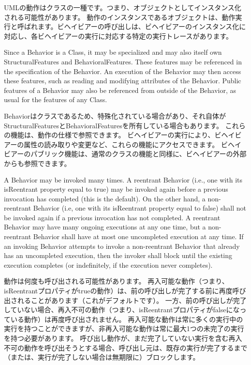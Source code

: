 \documentclass[a4paper,11pt]{ltjsarticle}
\begin{document}
UMLの動作はクラスの一種です。つまり、オブジェクトとしてインスタンス化される可能性があります。
動作のインスタンスであるオブジェクトは、動作実行と呼ばれます。ビヘイビアーの呼び出しは、ビヘイビアーのインスタンス化に対応し、各ビヘイビアーの実行に対応する特定の実行トレースがあります。

Since a Behavior is a Class, it may be specialized and may also itself own StructuralFeatures and BehavioralFeatures.
These features may be referenced in the specification of the Behavior. 
An execution of the Behavior may then access these features, such as reading and modifying attributes of the Behavior. 
Public features of a Behavior may also be referenced from outside of the Behavior, as usual for the features of any Class.

Behaviorはクラスであるため、特殊化されている場合があり、それ自体がStructuralFeaturesとBehavioralFeaturesを所有している場合もあります。
これらの機能は、動作の仕様で参照できます。
ビヘイビアーの実行により、ビヘイビアーの属性の読み取りや変更など、これらの機能にアクセスできます。
ビヘイビアーのパブリック機能は、通常のクラスの機能と同様に、ビヘイビアーの外部からも参照できます。

A Behavior may be invoked many times. 
A reentrant Behavior (i.e., one with its isReentrant property equal to true) may be invoked again before a previous invocation has completed (this is the default). 
On the other hand, a non-reentrant Behavior (i.e, one with its isReentrant property equal to false) shall not be invoked again if a previous invocation has not completed. 
A reentrant Behavior may have many ongoing executions at any one time, but a non-reentrant Behavior shall have at most one uncompleted execution at any time. 
If an invoking Behavior attempts to invoke a non-reentrant Behavior that already has an uncompleted execution, then the invoker shall block until the existing execution completes (or indefinitely, if the execution never completes).


動作は何度も呼び出される可能性があります。
再入可能な動作（つまり、isReentrantプロパティがtrueの動作）は、前の呼び出しが完了する前に再度呼び出されることがあります（これがデフォルトです）。
一方、前の呼び出しが完了していない場合、再入不可の動作（つまり、isReentrantプロパティがfalseになっている動作）は再度呼び出されません。
再入可能な動作は常に多くの実行中の実行を持つことができますが、非再入可能な動作は常に最大1つの未完了の実行を持つ必要があります。
呼び出し動作が、まだ完了していない実行を含む再入不可の動作を呼び出そうとする場合、呼び出し元は、既存の実行が完了するまで（または、実行が完了しない場合は無期限に）ブロックします。
\end{document}
